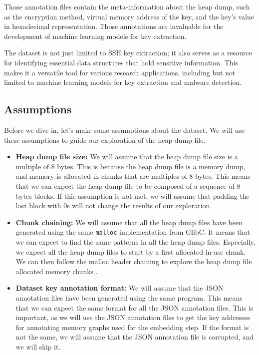     Those annotation files contain the meta-information about the heap dump, such as the encryption method, virtual memory address of the key, and the key's value in hexadecimal representation. Those annotations are invaluable for the development of machine learning models for key extraction. 

    The dataset is not just limited to SSH key extraction; it also serves as a resource for identifying essential data structures that hold sensitive information. This makes it a versatile tool for various research applications, including but not limited to machine learning models for key extraction and malware detection. 

    \subsection{Assumptions}\label{sec:methods:dataset:assumptions}
    Before we dive in, let's make some assumptions about the dataset. We will use these assumptions to guide our exploration of the heap dump file. 

    \begin{itemize}
        \item \textbf{Heap dump file size:} We will assume that the heap dump file size is a multiple of 8 bytes. This is because the heap dump file is a memory dump, and memory is allocated in chunks that are multiples of 8 bytes. This means that we can expect the heap dump file to be composed of a sequence of 8 bytes blocks. If this assumption is not met, we will assume that padding the last block with 0s will not change the results of our exploration.
        \item \textbf{Chunk chaining:} We will assume that all the heap dump files have been generated using the same \lstinline[language=c]|malloc| implementation from GlibC. It means that we can expect to find the same patterns in all the heap dump files. Especially, we expect all the heap dump files to start by a first allocated in-use chunk. We can then follow the malloc header chaining to explore the heap dump file allocated memory chunks \cite{MallocInternalsWiki2023}.
        \item \textbf{Dataset key annotation format:} We will assume that the JSON annotation files have been generated using the same program. This means that we can expect the same format for all the JSON annotation files. This is important, as we will use the JSON annotation files to get the key addresses for annotating memory graphs used for the embedding step. If the format is not the same, we will assume that the JSON annotation file is corrupted, and we will skip it.
    \end{itemize}

